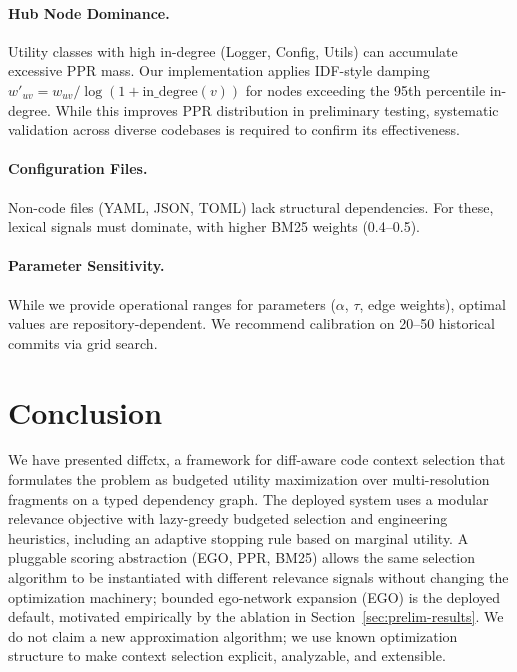 \documentclass[11pt, a4paper]{article}
\begin{document}
\paragraph{Hub Node Dominance.}
Utility classes with high in-degree (Logger, Config, Utils) can accumulate excessive PPR mass. Our implementation applies IDF-style damping $w'_{uv} = w_{uv} / \log(1 + \text{in\_degree}(v))$ for nodes exceeding the 95th percentile in-degree. While this improves PPR distribution in preliminary testing, systematic validation across diverse codebases is required to confirm its effectiveness.

\paragraph{Configuration Files.}
Non-code files (YAML, JSON, TOML) lack structural dependencies. For these, lexical signals must dominate, with higher BM25 weights (0.4--0.5).

\paragraph{Parameter Sensitivity.}
While we provide operational ranges for parameters ($\alpha$, $\tau$, edge weights), optimal values are repository-dependent. We recommend calibration on 20--50 historical commits via grid search.

\newpage
\section{Conclusion}

We have presented diffctx, a framework for diff-aware code context selection that formulates the problem as budgeted utility maximization over multi-resolution fragments on a typed dependency graph. The deployed system uses a modular relevance objective with lazy-greedy budgeted selection and engineering heuristics, including an adaptive stopping rule based on marginal utility. A pluggable scoring abstraction (EGO, PPR, BM25) allows the same selection algorithm to be instantiated with different relevance signals without changing the optimization machinery; bounded ego-network expansion (EGO) is the deployed default, motivated empirically by the ablation in Section~\ref{sec:prelim-results}. We do not claim a new approximation algorithm; we use known optimization structure to make context selection explicit, analyzable, and extensible.
\end{document}
